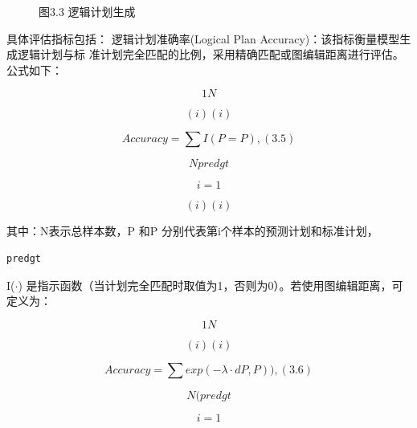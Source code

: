 \documentclass[12pt,a4paper,openright,UTF8]{ctexbook}
\begin{document}
\begin{figure}[htbp]
\centering
{}
\caption{图3.3 逻辑计划生成}
\end{figure}

具体评估指标包括： 逻辑计划准确率(Logical Plan Accuracy)：该指标衡量模型生成逻辑计划与标 准计划完全匹配的比例，采用精确匹配或图编辑距离进行评估。公式如下：

\begin{equation*}
1N
\end{equation*}

\begin{equation*}
(i)(i)
\end{equation*}

\begin{equation*}
Accuracy =\sum I(P = P ),(3.5)
\end{equation*}

\begin{equation*}
Npredgt
\end{equation*}

\begin{equation*}
i=1
\end{equation*}

\begin{equation*}
(i)(i)
\end{equation*}

其中：N表示总样本数，P 和P 分别代表第i个样本的预测计划和标准计划，

\begin{lstlisting}
predgt
\end{lstlisting}
I($\cdot$) 是指示函数（当计划完全匹配时取值为1，否则为0）。若使用图编辑距离，可 定义为：

\begin{equation*}
1N
\end{equation*}

\begin{equation*}
(i)(i)
\end{equation*}

\begin{equation*}
Accuracy =\sum exp(−\lambda\cdot dP, P )),(3.6)
\end{equation*}

\begin{equation*}
N(predgt
\end{equation*}

\begin{equation*}
i=1
\end{equation*}
\end{document}

